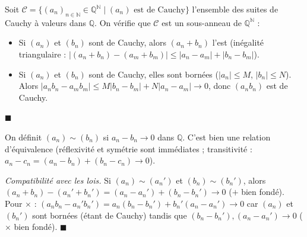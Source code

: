 \begin{mdframed}[style=proofbar]
  Soit $\mathcal{C} = \{(a_n)_{n\in\mathbb{N}} \in \mathbb{Q}^{\mathbb{N}} \mid (a_n)
  \text{ est de Cauchy}\}$ l'ensemble des suites de Cauchy à valeurs dans $\mathbb{Q}$.
  On vérifie que $\mathcal{C}$ est un sous-anneau de $\mathbb{Q}^{\mathbb{N}}$ :

  \begin{itemize}
    \item Si $(a_n)$ et $(b_n)$ sont de Cauchy, alors $(a_n + b_n)$ l'est
    (inégalité triangulaire : $|(a_n+b_n)-(a_m+b_m)| \leq |a_n-a_m|+|b_n-b_m|$).
    \item Si $(a_n)$ et $(b_n)$ sont de Cauchy, elles sont bornées
    ($|a_n| \leq M$, $|b_n| \leq N$). Alors
    $|a_nb_n - a_mb_m| \leq M|b_n-b_m| + N|a_n-a_m| \to 0$,
    donc $(a_nb_n)$ est de Cauchy.
  \end{itemize}
  \hfill$\blacksquare$
\end{mdframed}


\begin{mdframed}[style=proofbar]
  On définit $(a_n) \sim (b_n)$ si $a_n - b_n \to 0$ dans $\mathbb{Q}$.
  C'est bien une relation d'équivalence (réflexivité et symétrie sont immédiates ;
  transitivité : $a_n - c_n = (a_n - b_n) + (b_n - c_n) \to 0$).

  \textit{Compatibilité avec les lois.}
  Si $(a_n)\sim(a_n')$ et $(b_n)\sim(b_n')$, alors
  $(a_n+b_n)-(a_n'+b_n') = (a_n-a_n')+(b_n-b_n') \to 0$ ($+$ bien fondé).
  Pour $\times$ : $(a_nb_n - a_n'b_n') = a_n(b_n-b_n') + b_n'(a_n-a_n') \to 0$
  car $(a_n)$ et $(b_n')$ sont bornées (étant de Cauchy) tandis que
  $(b_n-b_n'),(a_n-a_n')\to 0$ ($\times$ bien fondé).
  \hfill$\blacksquare$
\end{mdframed}


